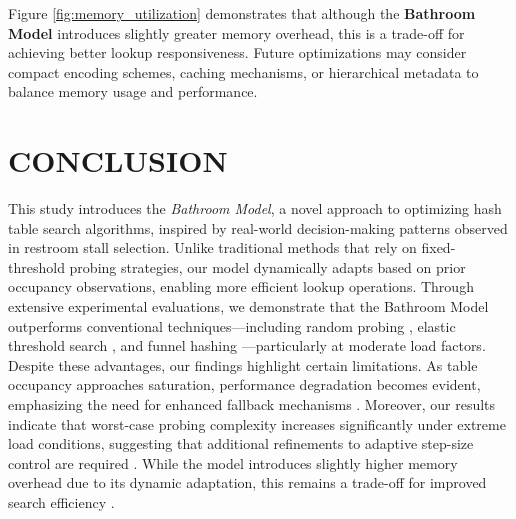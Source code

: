 \documentclass[letterpaper]{article}
\begin{document}
Figure \ref{fig:memory_utilization} demonstrates that although the \textbf{Bathroom Model} introduces slightly greater memory overhead, this is a trade-off for achieving better lookup responsiveness. Future optimizations may consider compact encoding schemes, caching mechanisms, or hierarchical metadata to balance memory usage and performance.



\section{CONCLUSION}

This study introduces the \textit{Bathroom Model}, a novel approach to optimizing hash table search algorithms, inspired by real-world decision-making patterns observed in restroom stall selection. Unlike traditional methods that rely on fixed-threshold probing strategies, our model dynamically adapts based on prior occupancy observations, enabling more efficient lookup operations. Through extensive experimental evaluations, we demonstrate that the Bathroom Model outperforms conventional techniques—including random probing \cite{knuth1998}, elastic threshold search \cite{farach2024}, and funnel hashing \cite{mitzenmacher2005}—particularly at moderate load factors. Despite these advantages, our findings highlight certain limitations. As table occupancy approaches saturation, performance degradation becomes evident, emphasizing the need for enhanced fallback mechanisms \cite{knuth1998}. Moreover, our results indicate that worst-case probing complexity increases significantly under extreme load conditions, suggesting that additional refinements to adaptive step-size control are required \cite{mitzenmacher2005}. While the model introduces slightly higher memory overhead due to its dynamic adaptation, this remains a trade-off for improved search efficiency \cite{cormen2009}.
\end{document}
